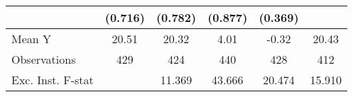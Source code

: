 {\begin{tabular}{l*{5}{c}}
            &     (0.716)         &     (0.782)         &     (0.877)         &     (0.369)         &                     \\
\midrule
Mean Y      &       20.51         &       20.32         &        4.01         &       -0.32         &       20.43         \\
Observations&         429         &         424         &         440         &         428         &         412         \\
Exc. Inst. F-stat&                     &      11.369         &      43.666         &      20.474         &      15.910         \\
\bottomrule
\end{tabular}
}
